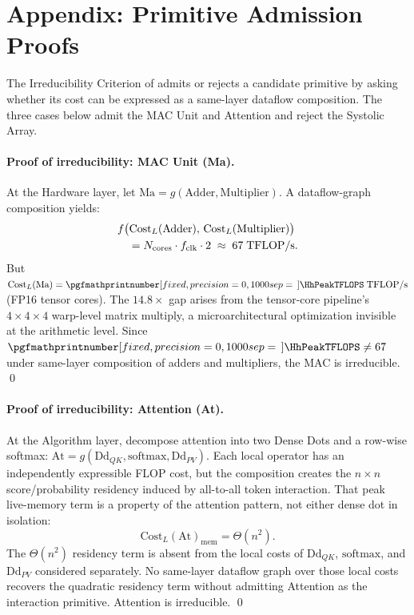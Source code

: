 \section*{Appendix: Primitive Admission Proofs}
\label{sec:appendix-proofs}

The Irreducibility Criterion of  admits or rejects a candidate primitive by asking whether its cost can be expressed as a same-layer dataflow composition. The three cases below admit the MAC Unit and Attention and reject the Systolic Array.

\paragraph{Proof of irreducibility: MAC Unit (Ma).} At the Hardware layer, let $\text{Ma} = g(\text{Adder}, \text{Multiplier})$. A dataflow-graph composition yields:
\begin{align}
\label{eq:mac-proof}
&f\bigl(\text{Cost}_L(\text{Adder}),\, \text{Cost}_L(\text{Multiplier})\bigr) \notag \\
&\quad = N_{\text{cores}} \cdot f_{\text{clk}} \cdot 2 \;\approx\; 67\;\text{TFLOP/s}.
\end{align}
But $\text{Cost}_L(\text{Ma}) = \cvalint{\HhPeakTFLOPS}\;\text{TFLOP/s}$ (FP16 tensor cores). The $14.8\times$ gap arises from the tensor-core pipeline's $4{\times}4{\times}4$ warp-level matrix multiply, a microarchitectural optimization invisible at the arithmetic level. Since $\cvalint{\HhPeakTFLOPS} \neq 67$ under same-layer composition of adders and multipliers, the MAC is irreducible. \qed

\paragraph{Proof of irreducibility: Attention (At).} At the Algorithm layer, decompose attention into two Dense Dots and a row-wise softmax: $\text{At} = g(\text{Dd}_{QK}, \mathrm{softmax}, \text{Dd}_{PV})$. Each local operator has an independently expressible FLOP cost, but the composition creates the $n \times n$ score/probability residency induced by all-to-all token interaction. That peak live-memory term is a property of the attention pattern, not either dense dot in isolation:
\begin{equation}
\label{eq:attn-proof}
\text{Cost}_L(\text{At})_{\text{mem}} = \Theta(n^2).
\end{equation}
The $\Theta(n^2)$ residency term is absent from the local costs of $\text{Dd}_{QK}$, $\mathrm{softmax}$, and $\text{Dd}_{PV}$ considered separately. No same-layer dataflow graph over those local costs recovers the quadratic residency term without admitting Attention as the interaction primitive. Attention is irreducible. \qed


